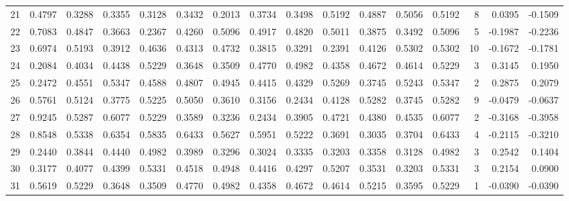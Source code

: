 \begin{tabular}{lrrrrrrrrrrrrrrr}
21  &      0.4797 &  0.3288 &  0.3355 &  0.3128 &  0.3432 &  0.2013 &  0.3734 &  0.3498 &  0.5192 &  0.4887 &   0.5056 &     0.5192 &      8 &                    0.0395 &                    -0.1509 \\
22  &      0.7083 &  0.4847 &  0.3663 &  0.2367 &  0.4260 &  0.5096 &  0.4917 &  0.4820 &  0.5011 &  0.3875 &   0.3492 &     0.5096 &      5 &                   -0.1987 &                    -0.2236 \\
23  &      0.6974 &  0.5193 &  0.3912 &  0.4636 &  0.4313 &  0.4732 &  0.3815 &  0.3291 &  0.2391 &  0.4126 &   0.5302 &     0.5302 &     10 &                   -0.1672 &                    -0.1781 \\
24  &      0.2084 &  0.4034 &  0.4438 &  0.5229 &  0.3648 &  0.3509 &  0.4770 &  0.4982 &  0.4358 &  0.4672 &   0.4614 &     0.5229 &      3 &                    0.3145 &                     0.1950 \\
25  &      0.2472 &  0.4551 &  0.5347 &  0.4588 &  0.4807 &  0.4945 &  0.4415 &  0.4329 &  0.5269 &  0.3745 &   0.5243 &     0.5347 &      2 &                    0.2875 &                     0.2079 \\
26  &      0.5761 &  0.5124 &  0.3775 &  0.5225 &  0.5050 &  0.3610 &  0.3156 &  0.2434 &  0.4128 &  0.5282 &   0.3745 &     0.5282 &      9 &                   -0.0479 &                    -0.0637 \\
27  &      0.9245 &  0.5287 &  0.6077 &  0.5229 &  0.3589 &  0.3236 &  0.2434 &  0.3905 &  0.4721 &  0.4380 &   0.4535 &     0.6077 &      2 &                   -0.3168 &                    -0.3958 \\
28  &      0.8548 &  0.5338 &  0.6354 &  0.5835 &  0.6433 &  0.5627 &  0.5951 &  0.5222 &  0.3691 &  0.3035 &   0.3704 &     0.6433 &      4 &                   -0.2115 &                    -0.3210 \\
29  &      0.2440 &  0.3844 &  0.4440 &  0.4982 &  0.3989 &  0.3296 &  0.3024 &  0.3335 &  0.3203 &  0.3358 &   0.3128 &     0.4982 &      3 &                    0.2542 &                     0.1404 \\
30  &      0.3177 &  0.4077 &  0.4399 &  0.5331 &  0.4518 &  0.4948 &  0.4416 &  0.4297 &  0.5207 &  0.3531 &   0.3203 &     0.5331 &      3 &                    0.2154 &                     0.0900 \\
31  &      0.5619 &  0.5229 &  0.3648 &  0.3509 &  0.4770 &  0.4982 &  0.4358 &  0.4672 &  0.4614 &  0.5215 &   0.3595 &     0.5229 &      1 &                   -0.0390 &                    -0.0390 \\

\end{tabular}

